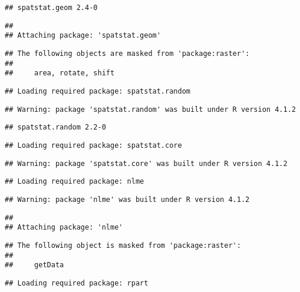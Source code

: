 \documentclass[]{article}
\begin{document}
\begin{verbatim}
## spatstat.geom 2.4-0
\end{verbatim}

\begin{verbatim}
## 
## Attaching package: 'spatstat.geom'
\end{verbatim}

\begin{verbatim}
## The following objects are masked from 'package:raster':
## 
##     area, rotate, shift
\end{verbatim}

\begin{verbatim}
## Loading required package: spatstat.random
\end{verbatim}

\begin{verbatim}
## Warning: package 'spatstat.random' was built under R version 4.1.2
\end{verbatim}

\begin{verbatim}
## spatstat.random 2.2-0
\end{verbatim}

\begin{verbatim}
## Loading required package: spatstat.core
\end{verbatim}

\begin{verbatim}
## Warning: package 'spatstat.core' was built under R version 4.1.2
\end{verbatim}

\begin{verbatim}
## Loading required package: nlme
\end{verbatim}

\begin{verbatim}
## Warning: package 'nlme' was built under R version 4.1.2
\end{verbatim}

\begin{verbatim}
## 
## Attaching package: 'nlme'
\end{verbatim}

\begin{verbatim}
## The following object is masked from 'package:raster':
## 
##     getData
\end{verbatim}

\begin{verbatim}
## Loading required package: rpart
\end{verbatim}
\end{document}
